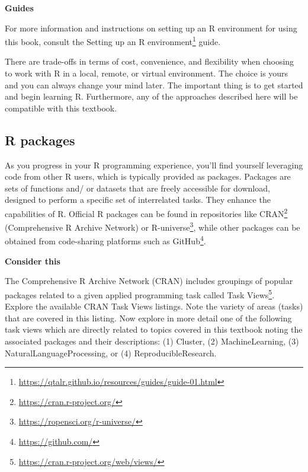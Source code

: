 \documentclass[
  letterpaper,
]{latex/krantz}
\theoremstyle{definition}
\theoremstyle{remark}
\DeclareRobustCommand{\href}[2]{#2\footnote{\url{#1}}}
\begin{document}
\begin{tcolorbox}[enhanced jigsaw, breakable, leftrule=.75mm, arc=.35mm, colframe=quarto-callout-color-frame, colback=white, left=2mm, bottomrule=.15mm, rightrule=.15mm, toprule=.15mm, opacityback=0]

\textbf{ Guides}

For more information and instructions on setting up an R environment for
using this book, consult the
\href{https://qtalr.github.io/resources/guides/guide-01.html}{Setting up
an R environment} guide.

\end{tcolorbox}

There are trade-offs in terms of cost, convenience, and flexibility when
choosing to work with R in a local, remote, or virtual environment. The
choice is yours and you can always change your mind later. The important
thing is to get started and begin learning R. Furthermore, any of the
approaches described here will be compatible with this textbook.

\subsection*{R packages}\label{sec-p-r-packages}

As you progress in your R programming experience, you'll find yourself
leveraging code from other R users, which is typically provided as
packages. Packages are sets of functions and/ or datasets that are
freely accessible for download, designed to perform a specific set of
interrelated tasks. They enhance the capabilities of R. Official R
packages can be found in repositories like
\href{https://cran.r-project.org/}{CRAN} (Comprehensive R Archive
Network) or \href{https://ropensci.org/r-universe/}{R-universe}, while
other packages can be obtained from code-sharing platforms such as
\href{https://github.com/}{GitHub}.

\begin{tcolorbox}[enhanced jigsaw, breakable, leftrule=.75mm, arc=.35mm, colframe=quarto-callout-color-frame, colback=white, left=2mm, bottomrule=.15mm, rightrule=.15mm, toprule=.15mm, opacityback=0]

\textbf{ Consider this}

The Comprehensive R Archive Network (CRAN) includes groupings of popular
packages related to a given applied programming task called
\href{https://cran.r-project.org/web/views/}{Task Views}. Explore the
available CRAN Task Views listings. Note the variety of areas (tasks)
that are covered in this listing. Now explore in more detail one of the
following task views which are directly related to topics covered in
this textbook noting the associated packages and their descriptions: (1)
Cluster, (2) MachineLearning, (3) NaturalLanguageProcessing, or (4)
ReproducibleResearch.

\end{tcolorbox}
\end{document}
